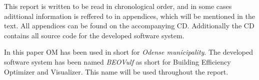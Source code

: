 This report is written to be read in chronological order, and in some cases adittional information is reffered to in appendices, which will be mentioned in the text. All appendices can be found on the accompanying CD. Additionally the CD contains all source code for the developed software system.

In this paper OM has been used in short for \emph{Odense municipality}. The developed software system has been named \emph{BEOVulf} as short for Building Efficiency Optimizer and Visualizer. This name will be used throughout the report.
